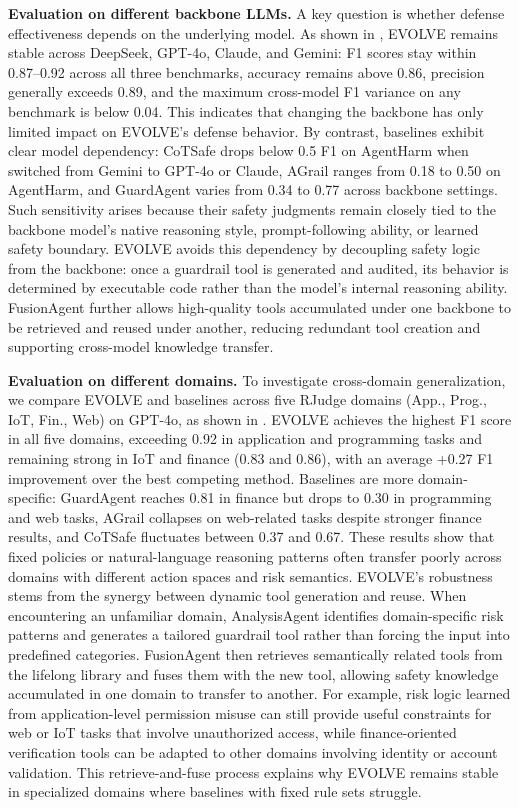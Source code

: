 \textbf{Evaluation on different backbone LLMs.}
A key question is whether defense effectiveness depends on the underlying model. As shown in , EVOLVE remains stable across DeepSeek, GPT-4o, Claude, and Gemini: F1 scores stay within 0.87--0.92 across all three benchmarks, accuracy remains above 0.86, precision generally exceeds 0.89, and the maximum cross-model F1 variance on any benchmark is below 0.04. This indicates that changing the backbone has only limited impact on EVOLVE's defense behavior. By contrast, baselines exhibit clear model dependency: CoTSafe drops below 0.5 F1 on AgentHarm when switched from Gemini to GPT-4o or Claude, AGrail ranges from 0.18 to 0.50 on AgentHarm, and GuardAgent varies from 0.34 to 0.77 across backbone settings. Such sensitivity arises because their safety judgments remain closely tied to the backbone model's native reasoning style, prompt-following ability, or learned safety boundary. EVOLVE avoids this dependency by decoupling safety logic from the backbone: once a guardrail tool is generated and audited, its behavior is determined by executable code rather than the model's internal reasoning ability. FusionAgent further allows high-quality tools accumulated under one backbone to be retrieved and reused under another, reducing redundant tool creation and supporting cross-model knowledge transfer.

\textbf{Evaluation on different domains.}
To investigate cross-domain generalization, we compare EVOLVE and baselines across five RJudge domains (App., Prog., IoT, Fin., Web) on GPT-4o, as shown in . EVOLVE achieves the highest F1 score in all five domains, exceeding 0.92 in application and programming tasks and remaining strong in IoT and finance (0.83 and 0.86), with an average +0.27 F1 improvement over the best competing method. Baselines are more domain-specific: GuardAgent reaches 0.81 in finance but drops to 0.30 in programming and web tasks, AGrail collapses on web-related tasks despite stronger finance results, and CoTSafe fluctuates between 0.37 and 0.67. These results show that fixed policies or natural-language reasoning patterns often transfer poorly across domains with different action spaces and risk semantics. EVOLVE's robustness stems from the synergy between dynamic tool generation and reuse. When encountering an unfamiliar domain, AnalysisAgent identifies domain-specific risk patterns and generates a tailored guardrail tool rather than forcing the input into predefined categories. FusionAgent then retrieves semantically related tools from the lifelong library and fuses them with the new tool, allowing safety knowledge accumulated in one domain to transfer to another. For example, risk logic learned from application-level permission misuse can still provide useful constraints for web or IoT tasks that involve unauthorized access, while finance-oriented verification tools can be adapted to other domains involving identity or account validation. This retrieve-and-fuse process explains why EVOLVE remains stable in specialized domains where baselines with fixed rule sets struggle.

